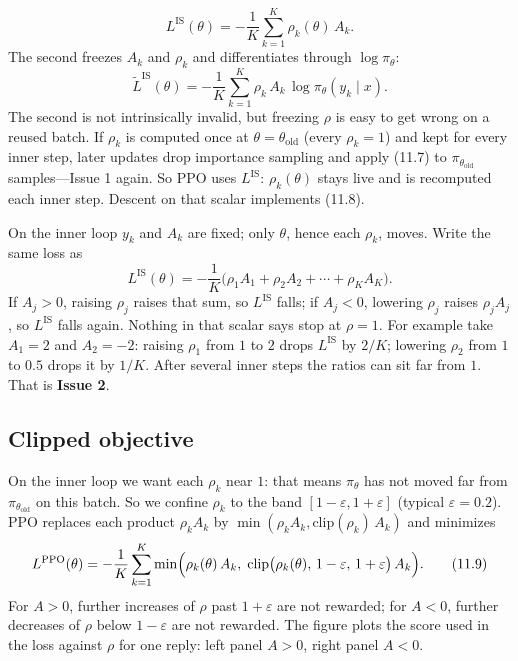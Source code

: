 \[L^{\mathrm{IS}}(\theta)
=
-\frac{1}{K}\sum_{k=1}^{K}\rho_k(\theta)\,A_k.
\] The second freezes $A_k$ and $\rho_k$ and differentiates through $\log\pi_\theta$: \[
\widetilde{L}^{\mathrm{IS}}(\theta)
=
-\frac{1}{K}\sum_{k=1}^{K}
\rho_k\,A_k\,\log\pi_\theta(y_k\mid x).
\] The second is not intrinsically invalid, but freezing $\rho$ is easy to get wrong on a reused batch. If $\rho_k$ is computed once at $\theta=\theta_{\mathrm{old}}$ (every $\rho_k=1$) and kept for every inner step, later updates drop importance sampling and apply (11.7) to $\pi_{\theta_{\mathrm{old}}}$ samples---Issue 1 again. So PPO uses $L^{\mathrm{IS}}$: $\rho_k(\theta)$ stays live and is recomputed each inner step. Descent on that scalar implements (11.8).

On the inner loop $y_k$ and $A_k$ are fixed; only $\theta$, hence each $\rho_k$, moves. Write the same loss as \[
L^{\mathrm{IS}}(\theta)
=
-\frac{1}{K}\bigl(\rho_1 A_1+\rho_2 A_2+\cdots+\rho_K A_K\bigr).
\] If $A_j>0$, raising $\rho_j$ raises that sum, so $L^{\mathrm{IS}}$ falls; if $A_j<0$, lowering $\rho_j$ raises $\rho_j A_j$, so $L^{\mathrm{IS}}$ falls again. Nothing in that scalar says stop at $\rho=1$. For example take $A_1=2$ and $A_2=-2$: raising $\rho_1$ from $1$ to $2$ drops $L^{\mathrm{IS}}$ by $2/K$; lowering $\rho_2$ from $1$ to $0.5$ drops it by $1/K$. After several inner steps the ratios can sit far from $1$. That is \textbf{Issue 2}.

\subsection{Clipped objective}

On the inner loop we want each $\rho_k$ near $1$: that means $\pi_\theta$ has not moved far from $\pi_{\theta_{\mathrm{old}}}$ on this batch. So we confine $\rho_k$ to the band $[1-\varepsilon,1+\varepsilon]$ (typical $\varepsilon=0.2$). PPO replaces each product $\rho_k A_k$ by $\min(\rho_k A_k,\mathrm{clip}(\rho_k)\,A_k)$ and minimizes \begin{equation}
L^{\mathrm{PPO}}(\theta)
=
-\frac{1}{K}\sum_{k=1}^{K}
\min\Bigl(
\rho_k(\theta)\,A_k,\;
\mathrm{clip}\bigl(\rho_k(\theta),\,1-\varepsilon,\,1+\varepsilon\bigr)\,A_k
\Bigr).
\tag{11.9}
\end{equation} For $A>0$, further increases of $\rho$ past $1+\varepsilon$ are not rewarded; for $A<0$, further decreases of $\rho$ below $1-\varepsilon$ are not rewarded. The figure plots the score used in the loss against $\rho$ for one reply: left panel $A>0$, right panel $A<0$.

